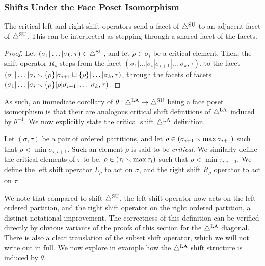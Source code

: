 
\subsubsection{Shifts Under the Face Poset Isomorphism}

\begin{lemma}
The critical left and right shift operators send a facet of $\triangle^{\mathrm{SU}}$ to an adjacent facet of $\triangle^{\mathrm{SU}}$. This can be interpreted as stepping through a shared facet of the facets.
\end{lemma}
\begin{proof}
Let $(\sigma_1|\dots|\sigma_k,\tau) \in \triangle^{\mathrm{SU}}$, and let $\rho \in \sigma_{i}$ be a critical element. Then, the shift operator $R_{\rho}$ steps from the facet $(\sigma_1|\dots|\sigma_i |\sigma_{i+1} |\dots|\sigma_k, \tau)$, to the facet $(\sigma_1|\dots|\sigma_i \smallsetminus \{\rho\}|\sigma_{i+1} \sqcup \{\rho\}|\dots|\sigma_k,\tau)$, through the facets of facets $(\sigma_1|\dots|\sigma_i \smallsetminus \{\rho\}|\rho|\sigma_{i+1}|\dots|\sigma_k, \tau)$.
\end{proof}

As such, an immediate corollary of $\theta:\triangle^{\mathrm{LA}} \to \triangle^{\mathrm{SU}}$ being a face poset isomorphism is that their are analogous critical shift definitions of $\triangle^{\mathrm{LA}}$ induced by $\theta^{-1}$. 
We now explicitly state the critical shift $\triangle^{\mathrm{LA}}$ definition.
\begin{definition} \label{def:critical LA shift}
Let $(\sigma,\tau)$ be a pair of ordered partitions, and let $\rho \in (\sigma_{i+1} \smallsetminus \max \sigma_{i+1})$ such that $\rho< \min \sigma_{i,i+1}$. Such an element $\rho$ is said to be \emph{critical}. 
We similarly define the critical elements of $\tau$ to be, $\rho \in (\tau_{i} \smallsetminus \max\tau_{i})$ such that $\rho < \min \tau_{i,i+1}$. 
We define the left shift operator $L_{\rho}$ to act on $\sigma$, and the right shift $R_{\rho}$ operator to act on $\tau$.
\end{definition}
We note that compared to shift $\triangle^{\mathrm{SU}}$, the left shift operator now acts on the left ordered partition, and the right shift operator on the right ordered partition, a distinct notational improvement.
The correctness of this definition can be verified directly by obvious variants of the proofs of this section for the $\triangle^{\mathrm{LA}}$ diagonal.
There is also a clear translation of the subset shift operator, which we will not write out in full. 
We now explore in example how the $\triangle^{\mathrm{LA}}$ shift structure is induced by $\theta$.

